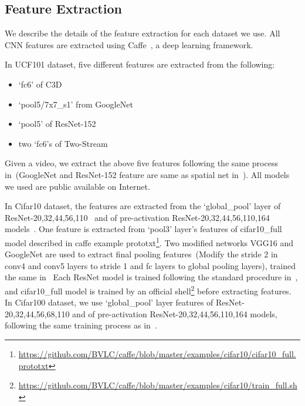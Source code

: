 \documentclass[letterpaper]{article}
\begin{document}


\subsection{Feature Extraction}
We describe the details of the feature extraction for each dataset we use.
All CNN features are extracted using Caffe~\cite{jia2014caffe}, a deep learning framework.

In UCF101 dataset, five different features are extracted from the following:
\begin{itemize}
  \item `fc6' of C3D~\cite{tran2015learning}
  \item `pool5/7x7\_s1' from GoogleNet~\cite{szegedy2015going}
  \item `pool5' of ResNet-152~\cite{he2015deep}
  \item two `fc6's of Two-Stream~\cite{simonyan2014two}
\end{itemize}
Given a video, we extract the above five features following the same process in~\cite{simonyan2014two,tran2015learning}(GoogleNet and ResNet-152 feature are same as spatial net in~\cite{simonyan2014two}).
All models we used are public available on Internet. %

In Cifar10 dataset, the features are extracted from the `global\_pool' layer of ResNet-20,32,44,56,110~\cite{he2015deep} and of pre-activation ResNet-20,32,44,56,110,164 models~\cite{he2016identity}.
One feature is extracted from `pool3' layer's features of cifar10\_full model described in caffe example prototxt\footnote{\url{https://github.com/BVLC/caffe/blob/master/examples/cifar10/cifar10_full.prototxt}}.
Two modified networks VGG16 and GoogleNet are used to extract final pooling features~(Modify the stride 2 in conv4 and conv5 layers to stride 1 and fc layers to global pooling layers), trained the same in~\cite{he2015deep}
Each ResNet model is trained following the standard procedure in~\cite{he2015deep,he2016identity}, and cifar10\_full model is trained by an official shell\footnote{\url{https://github.com/BVLC/caffe/blob/master/examples/cifar10/train_full.sh}} before extracting features.
In Cifar100 dataset, we use `global\_pool' layer features of ResNet-20,32,44,56,68,110 and of pre-activation ResNet-20,32,44,56,110,164 models, following the same training process as in~\cite{he2015deep,he2016identity}.
\end{document}
